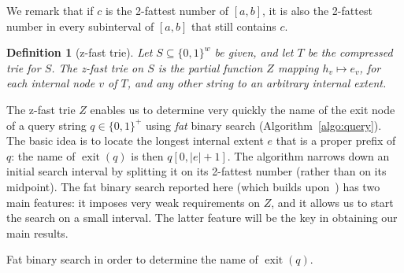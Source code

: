 \documentclass[a4paper,11pt]{article}
\newtheorem{definition}[theorem]{Definition}
\newcommand{\eps}{\varepsilon}
\newcommand{\?}{\mskip1.5mu}
\DeclareMathOperator{\exit}{exit}
\begin{document}
We remark that if $c$ is the 2-fattest number of $[a, b]$, it is also 
the 2-fattest number in every subinterval of $[a, b]$ that still 
contains $c$.

\begin{definition}[z-fast trie]
Let $S \subseteq \{0, 1\}^w$ be given, and let $T$ be the 
compressed trie for $S$. The \emph{z-fast trie on $S$} is 
the partial function $Z$ mapping $h_v \mapsto e_v$, for each 
internal node $v$ of $T$, and any other string to an
arbitrary internal extent.
\end{definition}

The z-fast trie $Z$ enables us to determine very quickly
the name of the exit node of a query string $q \in \{0,1\}^+$ using 
\emph{fat} binary search (Algorithm~\ref{algo:query}). The basic 
idea is to locate the longest internal extent $e$ that is a proper 
prefix of $q$: the name of $\exit(q)$ is then $q[0, |e| + 1]$. 
The algorithm narrows down an initial search interval by splitting 
it on its 2-fattest number (rather than on its midpoint).
The fat binary search reported here (which builds 
upon~\cite{BelazzouguiBoVi10}) has two main features:
it imposes very weak requirements on $Z$, and it allows us to start 
the search on a small interval. The latter feature will be the key 
in obtaining our main results.

\begin{algorithm}
\KwOut{the name of $\exit(q)$}
\If{$a = 0 \wedge e_\text{root}\neq\eps$}{%
  \Return $\eps$\;
} 
\caption{Fat binary search in order to 
  determine the name of $\exit(q)$.}
\label{algo:query}
\end{algorithm}
\end{document}
